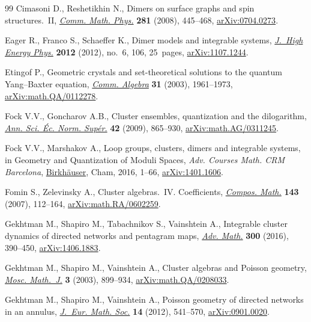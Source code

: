 \begin{thebibliography}{99}
Cimasoni D., Reshetikhin N., Dimers on surface graphs and spin
 structures.~{II},
 \href{https://doi.org/10.1007/s00220-008-0488-3}{\textit{Comm. Math. Phys.}}
 \textbf{281} (2008), 445--468,
 \href{http://arxiv.org/abs/0704.0273}{arXiv:0704.0273}.

Eager R., Franco S., Schaeffer K., Dimer models and integrable systems,
 \href{https://doi.org/10.1007/JHEP06(2012)106}{\textit{J.~High Energy Phys.}}
 \textbf{2012} (2012), no.~6, 106, 25~pages,
 \href{http://arxiv.org/abs/1107.1244}{arXiv:1107.1244}.

Etingof P., Geometric crystals and set-theoretical solutions to the quantum
 {Y}ang--{B}axter equation,
 \href{https://doi.org/10.1081/AGB-120018516}{\textit{Comm. Algebra}}
 \textbf{31} (2003), 1961--1973,
 \href{http://arxiv.org/abs/math.QA/0112278}{arXiv:math.QA/0112278}.

Fock V.V., Goncharov A.B., Cluster ensembles, quantization and the dilogarithm,
 \href{https://doi.org/10.24033/asens.2112}{\textit{Ann. Sci. \'Ec. Norm.
 Sup\'er.}} \textbf{42} (2009), 865--930,
 \href{http://arxiv.org/abs/math.AG/0311245}{arXiv:math.AG/0311245}.

Fock V.V., Marshakov A., Loop groups, clusters, dimers and integrable systems,
 in Geometry and Quantization of Moduli Spaces, \textit{Adv. Courses Math. CRM
 Barcelona}, \href{https://doi.org/10.1007/978-3-319-33578-0_1}{Birkh\"auser},
 Cham, 2016, 1--66, \href{http://arxiv.org/abs/1401.1606}{arXiv:1401.1606}.

Fomin S., Zelevinsky A., Cluster algebras.~{IV}. {C}oefficients,
 \href{https://doi.org/10.1112/S0010437X06002521}{\textit{Compos. Math.}}
 \textbf{143} (2007), 112--164,
 \href{http://arxiv.org/abs/math.RA/0602259}{arXiv:math.RA/0602259}.

Gekhtman M., Shapiro M., Tabachnikov S., Vainshtein A., Integrable cluster
 dynamics of directed networks and pentagram maps,
 \href{https://doi.org/10.1016/j.aim.2016.03.023}{\textit{Adv. Math.}}
 \textbf{300} (2016), 390--450,
 \href{http://arxiv.org/abs/1406.1883}{arXiv:1406.1883}.

Gekhtman M., Shapiro M., Vainshtein A., Cluster algebras and {P}oisson
 geometry,
 \href{https://doi.org/10.17323/1609-4514-2003-3-3-899-934}{\textit{Mosc.
 Math.~J.}} \textbf{3} (2003), 899--934,
 \href{http://arxiv.org/abs/math.QA/0208033}{arXiv:math.QA/0208033}.

Gekhtman M., Shapiro M., Vainshtein A., Poisson geometry of directed networks
 in an annulus, \href{https://doi.org/10.4171/JEMS/311}{\textit{J.~Eur. Math.
 Soc.}} \textbf{14} (2012), 541--570,
 \href{http://arxiv.org/abs/0901.0020}{arXiv:0901.0020}.


\end{thebibliography}
